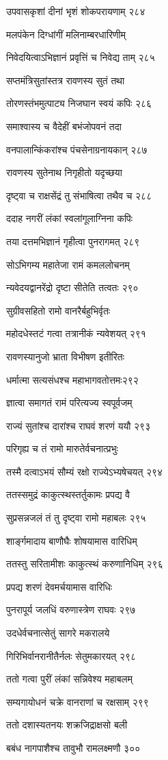 उपवासकृशां दीनां भृशं शोकपरायणाम् २८४

मलपंकेन दिग्धांगीं मलिनाम्बरधारिणीम्

निवेदयित्वाऽभिज्ञानं प्रवृत्तिं च निवेद्य ताम् २८५

सप्तमंत्रिसुतांस्तत्र रावणस्य सुतं तथा

तोरणस्तंभमुत्पाट्य निजघान स्वयं कपिः २८६

समाश्वास्य च वैदेहीं बभंजोपवनं तदा

वनपालान्किंकरांश्च पंचसेनाग्रनायकान् २८७

रावणस्य सुतेनाथ निगृहीतो यदृच्छया

दृष्ट्वा च राक्षसेंद्रं तु संभाषित्वा तथैव च २८८

ददाह नगरीं लंकां स्वलांगूलाग्निना कपिः

तया दत्तमभिज्ञानं गृहीत्वा पुनरागमत् २८९

सोऽभिगम्य महातेजा रामं कमललोचनम्

न्यवेदयद्वानरेंद्रो दृष्टा सीतेति तत्वतः २९०

सुग्रीवसहितो रामो वानरैर्बहुभिर्वृतः

महोदधेस्तटं गत्वा तत्रानीकं न्यवेशयत् २९१

रावणस्यानुजो भ्राता विभीषण इतीरितः

धर्मात्मा सत्यसंधश्च महाभागवतोत्तमः२९२

ज्ञात्वा समागतं रामं परित्यज्य स्वपूर्वजम्

राज्यं सुतांश्च दारांश्च राघवं शरणं ययौ २९३

परिगृह्य च तं रामो मारुतेर्वचनात्प्रभुः

तस्मै दत्वाऽभयं सौम्यं रक्षो राज्येऽभ्यषेचयत् २९४

ततस्समुद्रं काकुत्स्थस्तर्तुकामः प्रपद्य वै

सुप्रसन्नजलं तं तु दृष्ट्वा रामो महाबलः २९५

शार्ङ्गमादाय बाणौघैः शोषयामास वारिधिम्

ततस्तु सरितामीशः काकुत्स्थं करुणानिधिम् २९६

प्रपद्य शरणं देवमर्चयामास वारिधिः

पुनरापूर्य जलधिं वरुणास्त्रेण राघवः २९७

उदधेर्वचनात्सेतुं सागरे मकरालये

गिरिभिर्वानरानीतैर्नलः सेतुमकारयत् २९८

ततो गत्वा पुरीं लंकां सन्निवेश्य महाबलम्

सम्यगायोधनं चक्रे वानराणां च रक्षसाम् २९९

ततो दशास्यतनयः शक्रजिद्राक्षसो बली

बबंध नागपाशैश्च तावुभौ रामलक्ष्मणौ ३००

